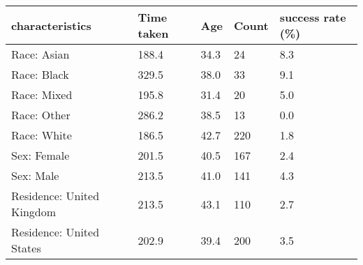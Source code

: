 \begin{tabular}{L{2in}|L{.7in}|L{.6in}|L{.6in}|L{1.2in}}\hline
characteristics& Time  taken &Age&Count& success  rate  (\%) \\\hline
 Race:  Asian &188.4&34.3&24&8.3\\\hline
 Race:  Black &329.5&38.0&33&9.1\\\hline
 Race:  Mixed &195.8&31.4&20&5.0\\\hline
 Race:  Other &286.2&38.5&13&0.0\\\hline
 Race:  White &186.5&42.7&220&1.8\\\hline
 Sex:  Female &201.5&40.5&167&2.4\\\hline
 Sex:  Male &213.5&41.0&141&4.3\\\hline
 Residence:  United  Kingdom &213.5&43.1&110&2.7\\\hline
 Residence:  United  States &202.9&39.4&200&3.5\\\hline
\hline\end{tabular}
